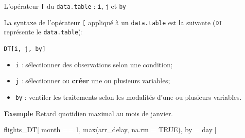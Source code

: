 \documentclass[12pt,ignorenonframetext,handout,]{beamer}
\newenvironment{Shaded}{}{}
\newcommand{\DataTypeTok}[1]{#1}
\newcommand{\DecValTok}[1]{#1}
\newcommand{\KeywordTok}[1]{\textcolor[rgb]{0.00,0.00,1.00}{#1}}
\newcommand{\NormalTok}[1]{#1}
\newcommand{\OperatorTok}[1]{#1}
\newcommand{\OtherTok}[1]{\textcolor[rgb]{1.00,0.25,0.00}{#1}}
\newcommand{\StringTok}[1]{\textcolor[rgb]{0.00,0.50,0.50}{#1}}
\providecommand{\tightlist}{%
  \setlength{\itemsep}{0pt}\setlength{\parskip}{0pt}}
\renewenvironment{Shaded}{\begin{snugshade}}{\end{snugshade}}
\newcommand{\intertitre}[1]{\textcolor{redInsee}{\textbf{#1}}}
\begin{document}
\begin{frame}[fragile]{L’opérateur \texttt{{[}} du \texttt{data.table} :
\texttt{i}, \texttt{j} et \texttt{by}}
\protect\hypertarget{loperateur-du-data.table-i-j-et-by}{}

La syntaxe de l’opérateur \texttt{{[}} appliqué à un \texttt{data.table}
est la suivante (\texttt{DT} représente le \texttt{data.table}):

\pause \centering \large

\texttt{DT{[}i,\ j,\ by{]}}

\raggedright \normalsize

\begin{itemize}
\tightlist
\item
  \texttt{i} : sélectionner des observations selon une condition;
\item
  \texttt{j} : sélectionner ou \textbf{créer} une ou plusieurs
  variables;
\item
  \texttt{by} : ventiler les traitements selon les modalités d’une ou
  plusieurs variables.
\end{itemize}

\pause \bigskip

\pause \intertitre{Exemple} Retard quotidien maximal au mois de janvier.

\small

\begin{Shaded}
\begin{Highlighting}[]
\NormalTok{flights_DT[}
\NormalTok{  month }\OperatorTok{==}\StringTok{ }\DecValTok{1}\NormalTok{, }\KeywordTok{max}\NormalTok{(arr_delay, }\DataTypeTok{na.rm =} \OtherTok{TRUE}\NormalTok{), by =}\StringTok{ }\NormalTok{day}
\NormalTok{]}
\end{Highlighting}
\end{Shaded}

\end{frame}
\end{document}
